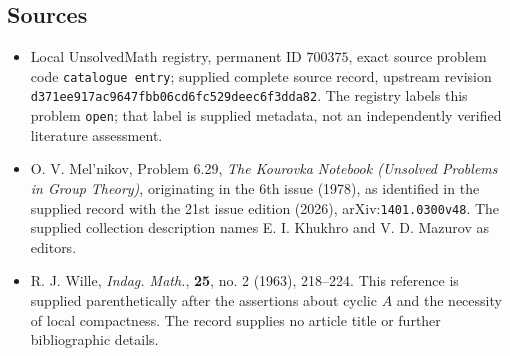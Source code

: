 \documentclass[11pt]{article}
\begin{document}
\subsection{Sources}
\begin{itemize}
\item Local UnsolvedMath registry, permanent ID \(700375\), exact source problem code \texttt{catalogue entry}; supplied complete source record, upstream revision \texttt{d371ee917ac9647fbb06cd6fc529deec6f3dda82}. The registry labels this problem \texttt{open}; that label is supplied metadata, not an independently verified literature assessment.
\item O. V. Mel'nikov, Problem 6.29, \emph{The Kourovka Notebook (Unsolved Problems in Group Theory)}, originating in the 6th issue (1978), as identified in the supplied record with the 21st issue edition (2026), arXiv:\texttt{1401.0300v48}. The supplied collection description names E. I. Khukhro and V. D. Mazurov as editors.
\item R. J. Wille, \emph{Indag. Math.}, \textbf{25}, no. 2 (1963), 218--224. This reference is supplied parenthetically after the assertions about cyclic \(A\) and the necessity of local compactness. The record supplies no article title or further bibliographic details.
\end{itemize}
\end{document}
